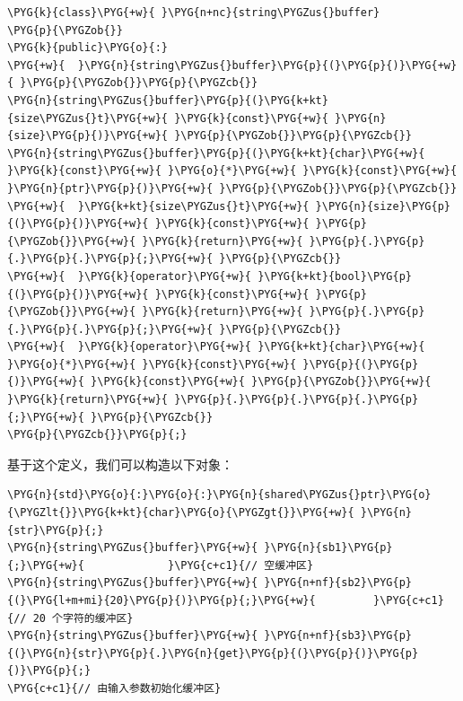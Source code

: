 \begin{codeblockbg}
\begin{Verbatim}[commandchars=\\\{\},breaklines=true,breakanywhere=true,fontsize=\codefont,xleftmargin=17bp]
\PYG{k}{class}\PYG{+w}{ }\PYG{n+nc}{string\PYGZus{}buffer}
\PYG{p}{\PYGZob{}}
\PYG{k}{public}\PYG{o}{:}
\PYG{+w}{  }\PYG{n}{string\PYGZus{}buffer}\PYG{p}{(}\PYG{p}{)}\PYG{+w}{ }\PYG{p}{\PYGZob{}}\PYG{p}{\PYGZcb{}}
\PYG{n}{string\PYGZus{}buffer}\PYG{p}{(}\PYG{k+kt}{size\PYGZus{}t}\PYG{+w}{ }\PYG{k}{const}\PYG{+w}{ }\PYG{n}{size}\PYG{p}{)}\PYG{+w}{ }\PYG{p}{\PYGZob{}}\PYG{p}{\PYGZcb{}}
\PYG{n}{string\PYGZus{}buffer}\PYG{p}{(}\PYG{k+kt}{char}\PYG{+w}{ }\PYG{k}{const}\PYG{+w}{ }\PYG{o}{*}\PYG{+w}{ }\PYG{k}{const}\PYG{+w}{ }\PYG{n}{ptr}\PYG{p}{)}\PYG{+w}{ }\PYG{p}{\PYGZob{}}\PYG{p}{\PYGZcb{}}
\PYG{+w}{  }\PYG{k+kt}{size\PYGZus{}t}\PYG{+w}{ }\PYG{n}{size}\PYG{p}{(}\PYG{p}{)}\PYG{+w}{ }\PYG{k}{const}\PYG{+w}{ }\PYG{p}{\PYGZob{}}\PYG{+w}{ }\PYG{k}{return}\PYG{+w}{ }\PYG{p}{.}\PYG{p}{.}\PYG{p}{.}\PYG{p}{;}\PYG{+w}{ }\PYG{p}{\PYGZcb{}}
\PYG{+w}{  }\PYG{k}{operator}\PYG{+w}{ }\PYG{k+kt}{bool}\PYG{p}{(}\PYG{p}{)}\PYG{+w}{ }\PYG{k}{const}\PYG{+w}{ }\PYG{p}{\PYGZob{}}\PYG{+w}{ }\PYG{k}{return}\PYG{+w}{ }\PYG{p}{.}\PYG{p}{.}\PYG{p}{.}\PYG{p}{;}\PYG{+w}{ }\PYG{p}{\PYGZcb{}}
\PYG{+w}{  }\PYG{k}{operator}\PYG{+w}{ }\PYG{k+kt}{char}\PYG{+w}{ }\PYG{o}{*}\PYG{+w}{ }\PYG{k}{const}\PYG{+w}{ }\PYG{p}{(}\PYG{p}{)}\PYG{+w}{ }\PYG{k}{const}\PYG{+w}{ }\PYG{p}{\PYGZob{}}\PYG{+w}{ }\PYG{k}{return}\PYG{+w}{ }\PYG{p}{.}\PYG{p}{.}\PYG{p}{.}\PYG{p}{;}\PYG{+w}{ }\PYG{p}{\PYGZcb{}}
\PYG{p}{\PYGZcb{}}\PYG{p}{;}
\end{Verbatim}
\end{codeblockbg}



基于这个定义，我们可以构造以下对象：



\begin{codeblockbg}
\begin{Verbatim}[commandchars=\\\{\},breaklines=true,breakanywhere=true,fontsize=\codefont,xleftmargin=17bp]
\PYG{n}{std}\PYG{o}{:}\PYG{o}{:}\PYG{n}{shared\PYGZus{}ptr}\PYG{o}{\PYGZlt{}}\PYG{k+kt}{char}\PYG{o}{\PYGZgt{}}\PYG{+w}{ }\PYG{n}{str}\PYG{p}{;}
\PYG{n}{string\PYGZus{}buffer}\PYG{+w}{ }\PYG{n}{sb1}\PYG{p}{;}\PYG{+w}{             }\PYG{c+c1}{// 空缓冲区}
\PYG{n}{string\PYGZus{}buffer}\PYG{+w}{ }\PYG{n+nf}{sb2}\PYG{p}{(}\PYG{l+m+mi}{20}\PYG{p}{)}\PYG{p}{;}\PYG{+w}{         }\PYG{c+c1}{// 20 个字符的缓冲区}
\PYG{n}{string\PYGZus{}buffer}\PYG{+w}{ }\PYG{n+nf}{sb3}\PYG{p}{(}\PYG{n}{str}\PYG{p}{.}\PYG{n}{get}\PYG{p}{(}\PYG{p}{)}\PYG{p}{)}\PYG{p}{;}
\PYG{c+c1}{// 由输入参数初始化缓冲区}
\end{Verbatim}
\end{codeblockbg}


